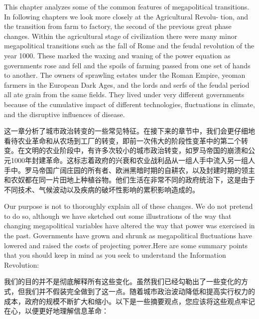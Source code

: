 \begin{paracol}{2}
This chapter analyzes some of the common features of megapolitical transitions. In following chapters we look more closely at the Agricultural Revolu- tion, and the transition from farm to factory, the second of the previous great phase changes. Within the agricultural stage of civilization there were many minor megapolitical transitions such as the fall of Rome and the feudal revolution of the year 1000. These marked the waxing and waning of the power equation as governments rose and fell and the spoils of farming passed from one set of hands to another. The owners of sprawling estates under the Roman Empire, yeoman farmers in the European Dark Ages, and the lords and serfs of the feudal period all ate grain from the same fields. They lived under very different governments because of the cumulative impact of different technologies, fluctuations in climate, and the disruptive influences of disease.

\switchcolumn
这一章分析了城市政治转变的一些常见特征。在接下来的章节中，我们会更仔细地看待农业革命和从农场到工厂的转变，即前一次伟大的阶段性变革中的第二个转变。在文明的农业阶段中，有许多次较小的城市政治转变，如罗马帝国的崩溃和公元1000年封建革命。这标志着政府的兴衰和农业战利品从一组人手中流入另一组人手中。罗马帝国广阔庄园的所有者、欧洲黑暗时期的自耕农，以及封建时期的领主和农奴都在同一片田地上种植谷物。他们生活在非常不同的政府统治下，这是由于不同技术、气候波动以及疾病的破坏性影响的累积影响造成的。

\switchcolumn*
Our purpose is not to thoroughly explain all of these changes. We do not pretend to do so, although we have sketched out some illustrations of the way that changing megapolitical variables have altered the way that power was exercised in the past. Governments have grown and shrunk as megapolitical fluctuations have lowered and raised the costs of projecting power.Here are some summary points that you should keep in mind as you seek to understand the Information Revolution:

\switchcolumn
我们的目的并不是彻底解释所有这些变化。虽然我们已经勾勒出了一些变化的方式，但我们并不假装完全做到了这一点。随着城市政治波动降低和提高实行权力的成本，政府的规模不断扩大和缩小。以下是一些摘要观点，您应该将这些观点牢记在心，以便更好地理解信息革命：


\end{paracol}
